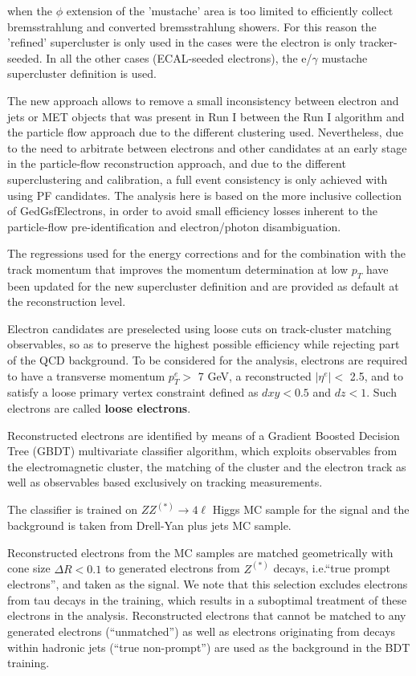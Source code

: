 when the $\phi$ extension of the 'mustache' area is too limited to efficiently
collect bremsstrahlung and converted bremsstrahlung showers. For this reason the
'refined' supercluster is only used in the cases were the electron is only
tracker-seeded. In all the other cases (ECAL-seeded electrons), the e/$\gamma$
mustache supercluster definition is used.
\par
The new approach allows to remove a small inconsistency between electron and
jets or MET objects that was present in Run I between the Run I algorithm
and the particle flow approach due to the different clustering used. Nevertheless,
due to the need to arbitrate between electrons and other candidates at an early
stage in the particle-flow reconstruction approach, and due to the different
superclustering and calibration, a full event consistency is only achieved with using
PF candidates. The analysis here is based on the more inclusive collection of
GedGsfElectrons, in order to avoid small efficiency losses inherent to the
particle-flow pre-identification and electron/photon disambiguation.
\par
The regressions used for the energy corrections and for the combination with the
track momentum that improves the momentum determination at low $p_T$ have been
updated for the new supercluster definition and are provided as default at the
reconstruction level.
\par
Electron candidates are preselected using loose cuts on track-cluster matching
observables, so as to preserve the highest possible efficiency while rejecting part
of the QCD background.
To be considered for the analysis, electrons are required to have a
transverse momentum $p^e_T >$ 7 GeV, a reconstructed $|\eta^e| <$ 2.5, and to satisfy a loose primary vertex constraint defined as $dxy < 0.5$ and $dz < 1$. Such electrons are called {\bf loose electrons}.

\par Reconstructed electrons are identified by means of a Gradient Boosted Decision Tree (GBDT) multivariate classifier algorithm, which exploits observables from the electromagnetic cluster, the matching of the cluster and the electron track as well as observables based exclusively on tracking measurements.

The classifier is trained on $ZZ^{(*)}\to4\ell$ Higgs MC sample for the signal and the background is taken from Drell-Yan plus jets MC sample.


Reconstructed electrons from the MC samples are matched geometrically with cone size $\Delta R < 0.1$ to generated electrons from $Z^{(*)}$ decays, i.e.``true prompt electrons'', and taken as the signal. We note that this selection excludes electrons from tau decays in the training, which results in a suboptimal treatment of these electrons in the analysis. Reconstructed electrons that cannot be matched to any generated electrons (``unmatched'') as well as electrons originating from decays within hadronic jets (``true non-prompt'') are used as the background in the BDT training.

